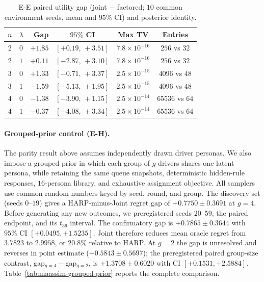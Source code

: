\begin{table}[t]
\centering\scriptsize
\caption{E-E paired utility gap (joint $-$ factored; $10$ common environment seeds, mean and $95\%$ CI) and posterior identity.}
\label{tab:maassim-parity}
\setlength{\tabcolsep}{3.5pt}
\begin{tabular}{ccrcc c}
\toprule
$n$ & $\lambda$ & Gap & $95\%$ CI & Max TV & Entries \\
\midrule
$2$ & $0$ & $+1.85$ & $[+0.19,\,+3.51]$ & $7.8\times10^{-16}$ & $256$ vs $32$ \\
$2$ & $1$ & $+0.11$ & $[-2.87,\,+3.10]$ & $7.8\times10^{-16}$ & $256$ vs $32$ \\
$3$ & $0$ & $+1.33$ & $[-0.71,\,+3.37]$ & $2.5\times10^{-15}$ & $4096$ vs $48$ \\
$3$ & $1$ & $-1.59$ & $[-5.13,\,+1.95]$ & $2.5\times10^{-15}$ & $4096$ vs $48$ \\
$4$ & $0$ & $-1.38$ & $[-3.90,\,+1.15]$ & $2.5\times10^{-14}$ & $65536$ vs $64$ \\
$4$ & $1$ & $-0.37$ & $[-4.08,\,+3.34]$ & $2.5\times10^{-14}$ & $65536$ vs $64$ \\
\bottomrule
\end{tabular}
\end{table}

\paragraph{Grouped-prior control (E-H).}
\label{app:why-joint}
The parity result above assumes independently drawn driver personas. We also impose a grouped prior in which each group of $g$ drivers shares one latent persona, while retaining the same queue snapshots, deterministic hidden-rule responses, $16$-persona library, and exhaustive assignment objective. All samplers use common random numbers keyed by seed, round, and group. The discovery set (seeds $0$--$19$) gives a HARP-minus-Joint regret gap of $+0.7750\pm0.3691$ at $g{=}4$. Before generating any new outcomes, we preregistered seeds $20$--$59$, the paired endpoint, and its $t_{39}$ interval. The confirmatory gap is $+0.7865\pm0.3644$ with $95\%$ CI $[+0.0495,+1.5235]$. Joint therefore reduces mean oracle regret from $3.7823$ to $2.9958$, or $20.8\%$ relative to HARP. At $g{=}2$ the gap is unresolved and reverses in point estimate ($-0.5843\pm0.5697$); the preregistered paired group-size contrast, gap$_{g=4}-$gap$_{g=2}$, is $+1.3708\pm0.6020$ with CI $[+0.1531,+2.5884]$. Table~\ref{tab:maassim-grouped-prior} reports the complete comparison.

